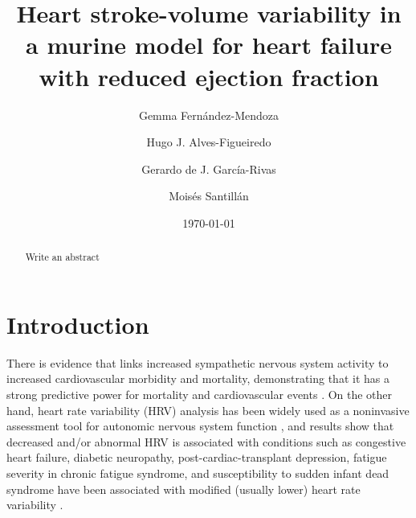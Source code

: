 \documentclass[%
preprint,
 amsmath,amssymb,
 aps,
]{revtex4-2}
\begin{document}
\preprint{}

\title{Heart stroke-volume variability in a murine model for heart failure with reduced ejection fraction}%

\author{Gemma Fernández-Mendoza}
%

\author{Hugo J. Alves-Figueiredo}

\author{Gerardo de J. García-Rivas}

%

\author{Moisés Santillán}
%

\date{\today}%

\begin{abstract}
Write an abstract
\end{abstract}

\maketitle


\section{\label{sec:intro}Introduction}

There is evidence that links increased sympathetic nervous system activity to increased cardiovascular morbidity and mortality, demonstrating that it has a strong predictive power for mortality and cardiovascular events \citep{Malpas_2010}. On the other hand, heart rate variability (HRV) analysis has been widely used as a noninvasive assessment tool for autonomic nervous system function \citep{Kiyono_2016}, and results show that decreased and/or abnormal HRV is associated with conditions such as congestive heart failure, diabetic neuropathy, post-cardiac-transplant depression, fatigue severity in chronic fatigue syndrome, and susceptibility to sudden infant dead syndrome have been associated with modified (usually lower) heart rate variability \citep{Kamen_1995, Rajendra_Acharya_2006, Zeki_Al_Hazzouri_2014, Escorihuela_2020}. 
\end{document}
